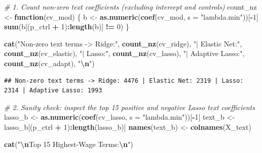 \documentclass[
]{article}
\newenvironment{Shaded}{\begin{snugshade}}{\end{snugshade}}
\newcommand{\AttributeTok}[1]{\textcolor[rgb]{0.13,0.29,0.53}{#1}}
\newcommand{\CommentTok}[1]{\textcolor[rgb]{0.56,0.35,0.01}{\textit{#1}}}
\newcommand{\ControlFlowTok}[1]{\textcolor[rgb]{0.13,0.29,0.53}{\textbf{#1}}}
\newcommand{\DecValTok}[1]{\textcolor[rgb]{0.00,0.00,0.81}{#1}}
\newcommand{\FunctionTok}[1]{\textcolor[rgb]{0.13,0.29,0.53}{\textbf{#1}}}
\newcommand{\NormalTok}[1]{#1}
\newcommand{\OtherTok}[1]{\textcolor[rgb]{0.56,0.35,0.01}{#1}}
\newcommand{\SpecialCharTok}[1]{\textcolor[rgb]{0.81,0.36,0.00}{\textbf{#1}}}
\newcommand{\StringTok}[1]{\textcolor[rgb]{0.31,0.60,0.02}{#1}}
\begin{document}
\begin{Shaded}
\begin{Highlighting}[]
\CommentTok{\# 1. Count non{-}zero text coefficients (excluding intercept and controls)}
\NormalTok{count\_nz }\OtherTok{\textless{}{-}} \ControlFlowTok{function}\NormalTok{(cv\_mod) \{}
\NormalTok{  b }\OtherTok{\textless{}{-}} \FunctionTok{as.numeric}\NormalTok{(}\FunctionTok{coef}\NormalTok{(cv\_mod, }\AttributeTok{s =} \StringTok{"lambda.min"}\NormalTok{))[}\SpecialCharTok{{-}}\DecValTok{1}\NormalTok{]}
  \FunctionTok{sum}\NormalTok{(b[(p\_ctrl }\SpecialCharTok{+} \DecValTok{1}\NormalTok{)}\SpecialCharTok{:}\FunctionTok{length}\NormalTok{(b)] }\SpecialCharTok{!=} \DecValTok{0}\NormalTok{)}
\NormalTok{\}}

\FunctionTok{cat}\NormalTok{(}\StringTok{"Non{-}zero text terms {-}\textgreater{} Ridge:"}\NormalTok{, }\FunctionTok{count\_nz}\NormalTok{(cv\_ridge),}
    \StringTok{"| Elastic Net:"}\NormalTok{, }\FunctionTok{count\_nz}\NormalTok{(cv\_elastic),}
    \StringTok{"| Lasso:"}\NormalTok{, }\FunctionTok{count\_nz}\NormalTok{(cv\_lasso),}
    \StringTok{"| Adaptive Lasso:"}\NormalTok{, }\FunctionTok{count\_nz}\NormalTok{(cv\_adapt), }\StringTok{"}\SpecialCharTok{\textbackslash{}n}\StringTok{"}\NormalTok{)}
\end{Highlighting}
\end{Shaded}

\begin{verbatim}
## Non-zero text terms -> Ridge: 4476 | Elastic Net: 2319 | Lasso: 2314 | Adaptive Lasso: 1993
\end{verbatim}

\begin{Shaded}
\begin{Highlighting}[]
\CommentTok{\# 2. Sanity check: inspect the top 15 positive and negative Lasso text coefficients}
\NormalTok{lasso\_b }\OtherTok{\textless{}{-}} \FunctionTok{as.numeric}\NormalTok{(}\FunctionTok{coef}\NormalTok{(cv\_lasso, }\AttributeTok{s =} \StringTok{"lambda.min"}\NormalTok{))[}\SpecialCharTok{{-}}\DecValTok{1}\NormalTok{]}
\NormalTok{text\_b  }\OtherTok{\textless{}{-}}\NormalTok{ lasso\_b[(p\_ctrl }\SpecialCharTok{+} \DecValTok{1}\NormalTok{)}\SpecialCharTok{:}\FunctionTok{length}\NormalTok{(lasso\_b)]}
\FunctionTok{names}\NormalTok{(text\_b) }\OtherTok{\textless{}{-}} \FunctionTok{colnames}\NormalTok{(X\_text)}

\FunctionTok{cat}\NormalTok{(}\StringTok{"}\SpecialCharTok{\textbackslash{}n}\StringTok{Top 15 Highest{-}Wage Terms:}\SpecialCharTok{\textbackslash{}n}\StringTok{"}\NormalTok{)}
\end{Highlighting}
\end{Shaded}
\end{document}
